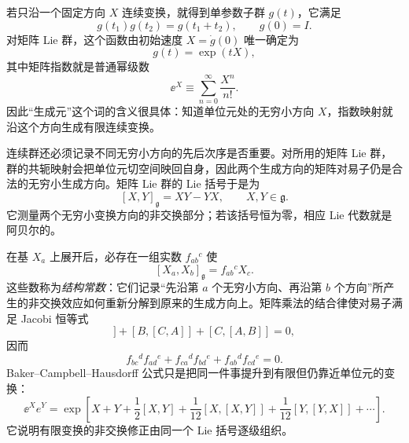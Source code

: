若只沿一个固定方向 $X$ 连续变换，就得到单参数子群 $g(t)$，它满足
\begin{equation}
 g(t_1)g(t_2)=g(t_1+t_2),
 \qquad g(0)=I.
 \label{eq:one-param-group-dp11}
\end{equation}
对矩阵 Lie 群，这个函数由初始速度 $X=\dot g(0)$ 唯一确定为
\begin{equation}
 {g(t)=\exp(tX),}
 \label{eq:one-param-exp-dp11}
\end{equation}
其中矩阵指数就是普通幂级数
\begin{equation}
 \ee^X\equiv\sum_{n=0}^{\infty}\frac{X^n}{n!}.
 \label{eq:matrix-exponential-series-dp68}
\end{equation}
因此“生成元”这个词的含义很具体：知道单位元处的无穷小方向 $X$，指数映射就沿这个方向生成有限连续变换。

连续群还必须记录不同无穷小方向的先后次序是否重要。对所用的矩阵 Lie 群，群的共轭映射会把单位元切空间映回自身，因此两个生成方向的矩阵对易子仍是合法的无穷小生成方向。矩阵 Lie 群的 Lie 括号于是为
\begin{equation}
 {[X,Y]_{\mathfrak g}=XY-YX,\qquad X,Y\in\mathfrak g.}
 \label{eq:matrix-lie-bracket-math-dp76}
\end{equation}
它测量两个无穷小变换方向的非交换部分；若该括号恒为零，相应 Lie 代数就是阿贝尔的。

在基 $X_a$ 上展开后，必存在一组实数 $f_{ab}{}^c$ 使
\begin{equation}
 {[X_a,X_b]_{\mathfrak g}=f_{ab}{}^cX_c.}
 \label{eq:lie-algebra-general-dp11}
\end{equation}
这些数称为\emph{结构常数}：它们记录“先沿第 $a$ 个无穷小方向、再沿第 $b$ 个方向”所产生的非交换效应如何重新分解到原来的生成方向上。矩阵乘法的结合律使对易子满足 Jacobi 恒等式
\begin{equation}
 [A,[B,C]]+[B,[C,A]]+[C,[A,B]]=0,
 \label{eq:commutator-jacobi-dp68}
\end{equation}
因而
\begin{equation}
 {
 f_{bc}{}^{d}f_{ad}{}^{e}
 +f_{ca}{}^{d}f_{bd}{}^{e}
 +f_{ab}{}^{d}f_{cd}{}^{e}=0.}
 \label{eq:jacobi-structure-dp11}
\end{equation}
Baker--Campbell--Hausdorff 公式只是把同一件事提升到有限但仍靠近单位元的变换：
\begin{equation}
 \ee^Xe^Y
 =\exp\!\left[
 X+Y+\frac12[X,Y]
 +\frac1{12}[X,[X,Y]]+\frac1{12}[Y,[Y,X]]+\cdots
 \right].
 \label{eq:bch-lie-dp11}
\end{equation}
它说明有限变换的非交换修正由同一个 Lie 括号逐级组织。

